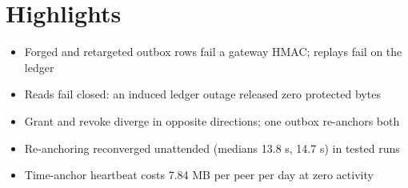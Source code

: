 \documentclass{article}
\begin{document}
\section*{Highlights}
\begin{itemize}
\item Forged and retargeted outbox rows fail a gateway HMAC; replays fail on the ledger
\item Reads fail closed: an induced ledger outage released zero protected bytes
\item Grant and revoke diverge in opposite directions; one outbox re-anchors both
\item Re-anchoring reconverged unattended (medians 13.8 s, 14.7 s) in tested runs
\item Time-anchor heartbeat costs 7.84 MB per peer per day at zero activity
\end{itemize}
\end{document}
